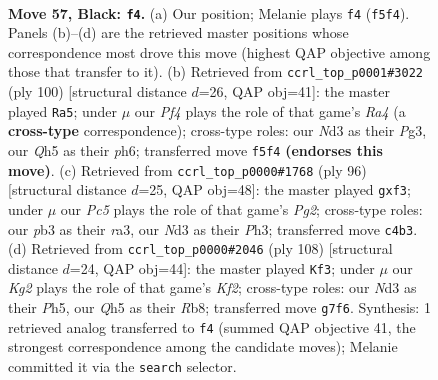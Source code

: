 \documentclass[11pt]{article}
\begin{document}
\clearpage

\begin{figure}[p]\centering
\begin{subfigure}{0.46\textwidth}\centering
\resizebox{\linewidth}{!}{%
\newchessgame
\chessboard[
  setfen={8/p5k1/1p6/5p1q/P1p5/RP1n2P1/6K1/8 b - - 0 57},
  showmover=false,
  pgfstyle=straightmove, color=movearrow, markmove={f5-f4}
]}
\caption{}
\end{subfigure}\hfill
\begin{subfigure}{0.46\textwidth}\centering
\resizebox{\linewidth}{!}{%
\newchessgame
\chessboard[
  setfen={4r3/5ppk/7p/8/R7/4p1PP/5P2/5K2 w - - 0 51},
  showmover=false,
  pgfstyle=straightmove, color=movearrow, markmove={a4-a5}
]}
\caption{}
\end{subfigure}
\\[4pt]
\begin{subfigure}{0.46\textwidth}\centering
\resizebox{\linewidth}{!}{%
\newchessgame
\chessboard[
  setfen={3R4/1p4p1/6kp/4P3/P7/r4p1P/6P1/7K w - - 0 49},
  showmover=false,
  pgfstyle=straightmove, color=movearrow, markmove={g2-f3}
]}
\caption{}
\end{subfigure}\hfill
\begin{subfigure}{0.46\textwidth}\centering
\resizebox{\linewidth}{!}{%
\newchessgame
\chessboard[
  setfen={1R6/5k2/4p2p/4rp1P/6P1/8/5KP1/8 w - - 2 55},
  showmover=false,
  pgfstyle=straightmove, color=movearrow, markmove={f2-f3}
]}
\caption{}
\end{subfigure}
\caption{\textbf{Move 57, Black: \texttt{f4}.} (a) Our position; Melanie plays \texttt{f4} (\texttt{f5f4}). Panels (b)--(d) are the retrieved master positions whose correspondence most drove this move (highest QAP objective among those that transfer to it). (b) Retrieved from \texttt{ccrl\_top\_p0001\#3022} (ply 100) [structural distance $d$=26, QAP obj=41]: the master played \texttt{Ra5}; under $\mu$ our \emph{Pf4} plays the role of that game's \emph{Ra4} (a \textbf{cross-type} correspondence); cross-type roles: our \emph{N}d3 as their \emph{P}g3, our \emph{Q}h5 as their \emph{p}h6; transferred move \texttt{f5f4} \textbf{(endorses this move)}. (c) Retrieved from \texttt{ccrl\_top\_p0000\#1768} (ply 96) [structural distance $d$=25, QAP obj=48]: the master played \texttt{gxf3}; under $\mu$ our \emph{Pc5} plays the role of that game's \emph{Pg2}; cross-type roles: our \emph{p}b3 as their \emph{r}a3, our \emph{N}d3 as their \emph{P}h3; transferred move \texttt{c4b3}. (d) Retrieved from \texttt{ccrl\_top\_p0000\#2046} (ply 108) [structural distance $d$=24, QAP obj=44]: the master played \texttt{Kf3}; under $\mu$ our \emph{Kg2} plays the role of that game's \emph{Kf2}; cross-type roles: our \emph{N}d3 as their \emph{P}h5, our \emph{Q}h5 as their \emph{R}b8; transferred move \texttt{g7f6}. Synthesis: 1 retrieved analog transferred to \texttt{f4} (summed QAP objective 41, the strongest correspondence among the candidate moves); Melanie committed it via the \texttt{search} selector.}
\label{fig:thought-m113}
\end{figure}
\end{document}
